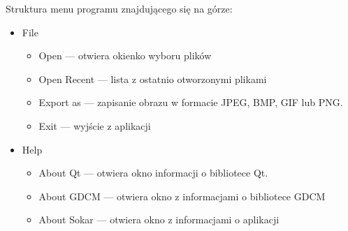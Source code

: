 \par
Struktura menu programu znajdującego się na górze:
\begin{itemize}
    \item File
          \begin{itemize}
              \item Open --- otwiera okienko wyboru plików
              \item Open Recent --- lista z ostatnio otworzonymi plikami
              \item Export as --- zapisanie obrazu w formacie JPEG, BMP, GIF lub PNG.
              \item Exit --- wyjście z aplikacji
          \end{itemize}
    \item Help
          \begin{itemize}
              \item About Qt --- otwiera okno informacji o bibliotece Qt.
              \item About GDCM --- otwiera okno z informacjami o bibliotece GDCM
              \item About Sokar --- otwiera okno z informacjami o aplikacji
          \end{itemize}
\end{itemize}